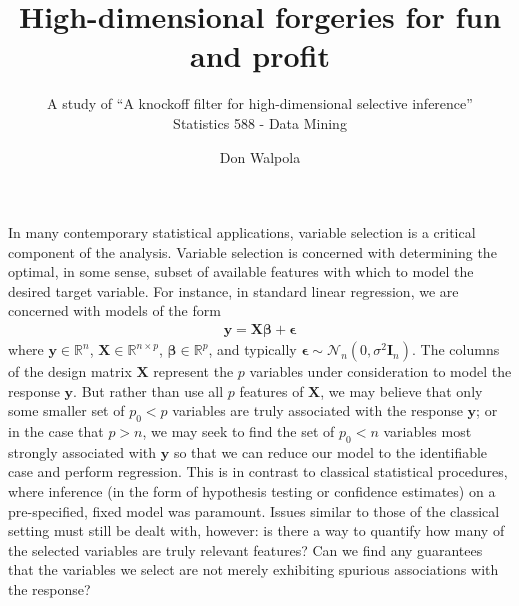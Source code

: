 \documentclass[]{scrartcl}
\title{High-dimensional forgeries for fun and profit}
\subtitle{A study of ``A knockoff filter for high-dimensional selective inference'' \\ Statistics 588 - Data Mining}
\author{Don Walpola}
\date{}
\newcommand{\1}[1]{\mathbbm{1}_{\left\{#1\right\}}}
\begin{document}
\maketitle

In many contemporary statistical applications, variable selection is a critical component of the analysis. Variable selection is concerned with determining the optimal, in some sense, subset of available features with which to model the desired target variable. For instance, in standard linear regression, we are concerned with models of the form 
\begin{align}\label{eq:1}
	\mathbf{y} = \mathbf{\mathbf{X}}\pmb\beta + \pmb\epsilon
\end{align}
where $\mathbf{y} \in \mathbb{R}^{n}$, $\mathbf{\mathbf{X}} \in \mathbb{R}^{n \times p}$, $\pmb\beta \in \mathbb{R}^{p}$, and typically $\pmb\epsilon \sim \mathcal{N}_{n}(0, \sigma^{2} \mathbf{I}_{n})$. The columns of the design matrix $\mathbf{\mathbf{X}}$ represent the $p$ variables under consideration to model the response $\mathbf{y}$. But rather than use all $p$ features of $\mathbf{\mathbf{X}}$, we may believe that only some smaller set of $p_{0} < p$ variables are truly associated with the response $\mathbf{y}$; or in the case that $p > n$, we may seek to find the set of $p_{0} < n$ variables most strongly associated with $\mathbf{y}$ so that we can reduce our model to the identifiable case and perform regression. This is in contrast to classical statistical procedures, where inference (in the form of hypothesis testing or confidence estimates) on a pre-specified, fixed model was paramount. Issues similar to those of the classical setting must still be dealt with, however: is there a way to quantify how many of the selected variables are truly relevant features? Can we find any guarantees that the variables we select are not merely exhibiting spurious associations with the response? 
\end{document}
